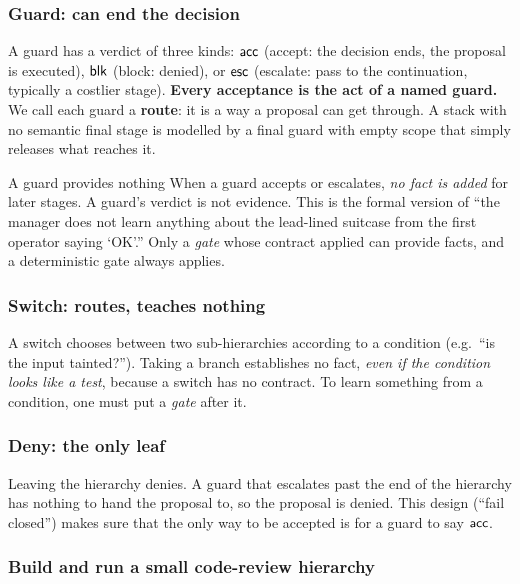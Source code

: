 \subsubsection{Guard: can end the decision}

A guard has a verdict of three kinds: $\mathsf{acc}$ (accept: the decision ends, the proposal is executed), $\mathsf{blk}$ (block: denied), or $\mathsf{esc}$ (escalate: pass to the continuation, typically a costlier stage). \textbf{Every acceptance is the act of a named guard.} We call each guard a \textbf{route}: it is a way a proposal can get through. A stack with no semantic final stage is modelled by a final guard with empty scope that simply releases what reaches it.

\begin{warning}{A guard provides nothing}
When a guard accepts or escalates, \emph{no fact is added} for later stages. A guard's verdict is not evidence. This is the formal version of ``the manager does not learn anything about the lead-lined suitcase from the first operator saying `OK'.'' Only a \emph{gate} whose contract applied can provide facts, and a deterministic gate always applies.
\end{warning}

\subsubsection{Switch: routes, teaches nothing}

A switch chooses between two sub-hierarchies according to a condition (e.g.\ ``is the input tainted?''). Taking a branch establishes no fact, \emph{even if the condition looks like a test}, because a switch has no contract. To learn something from a condition, one must put a \emph{gate} after it.

\subsubsection{Deny: the only leaf}

Leaving the hierarchy denies. A guard that escalates past the end of the hierarchy has nothing to hand the proposal to, so the proposal is denied. This design (``fail closed'') makes sure that the only way to be accepted is for a guard to say $\mathsf{acc}$.

\subsubsection{Build and run a small code-review hierarchy}
\label{sec:code-review-constructors}

